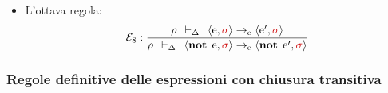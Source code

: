 \documentclass[a4paper]{article}
\begin{document}
\begin{itemize}
 		\item L'ottava regola:
 		\begin{equation*}
 			\mathcal{E}_{8} : \dfrac{
 				\rho \:\: \vdash_{\Delta} \:\: \left\langle \mathrm{e}, \textcolor{Red3}{\sigma} \right\rangle \rightarrow_{\mathrm{e}} \left\langle \mathrm{e}', \textcolor{Red3}{\sigma} \right\rangle
 			}{
 				\rho \:\: \vdash_{\Delta} \:\: \left\langle \mathbf{not} \:\: \mathrm{e}, \textcolor{Red3}{\sigma} \right\rangle \rightarrow_{\mathrm{e}} \left\langle \mathbf{not} \:\: \mathrm{e}', \textcolor{Red3}{\sigma} \right\rangle
 			}
 		\end{equation*}
 	\end{itemize}\newpage
 	
 	\subsubsection{Regole definitive delle espressioni con chiusura transitiva}
 	
\end{document}
